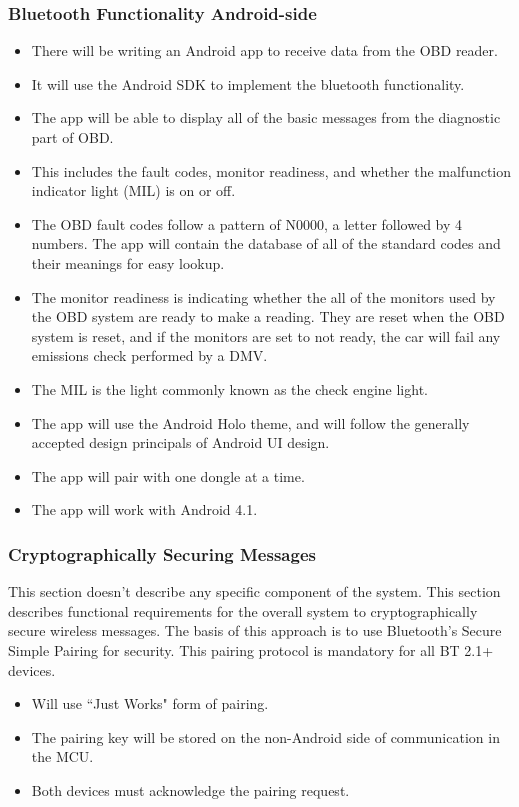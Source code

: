 \documentclass[12pt,letterpaper]{article}
\begin{document}
\subsubsection{Bluetooth Functionality Android-side}
\begin{itemize}
	\item There will be writing an Android app to receive data from the OBD reader.
	\item It will use the Android SDK to implement the bluetooth functionality.
	\item The app will be able to display all of the basic messages from the diagnostic part of OBD.
	\item This includes the fault codes, monitor readiness, and whether the malfunction indicator light (MIL) is on or off.
	\item The OBD fault codes follow a pattern of N0000, a letter followed by 4 numbers. The app will contain the database of all of the standard codes and their meanings for easy lookup. 
	\item  The monitor readiness is indicating whether the all of the monitors used by the OBD system are ready to make a reading. They are reset when the OBD system is reset, and if the monitors are set to not ready, the car will fail any emissions check performed by a DMV. 
	\item The MIL is the light commonly known as the check engine light. 
	\item The app will use the Android Holo theme, and will follow the generally accepted design principals of Android UI design.
	\item The app will pair with one dongle at a time.
	\item The app will work with Android 4.1.

\end{itemize}

\subsubsection{Cryptographically Securing Messages}
This section doesn't describe any specific component of the system. This section describes functional requirements for the overall system to cryptographically secure wireless messages. The basis of this approach is to use Bluetooth's Secure Simple Pairing for security. This pairing protocol is mandatory for all BT 2.1+ devices.

\begin{itemize}
	\item Will use ``Just Works" form of pairing.
	\item The pairing key will be stored on the non-Android side of communication in the MCU.
	\item Both devices must acknowledge the pairing request.
\end{itemize}
\end{document}
